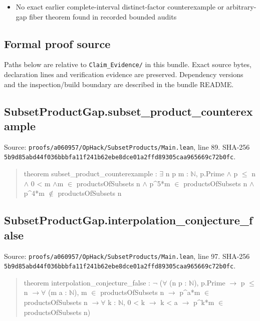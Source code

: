 \documentclass[11pt,a4paper]{article}
\begin{document}
\begin{itemize}
\item No exact earlier complete-interval distinct-factor counterexample or arbitrary-gap fiber theorem found in recorded bounded audits
\end{itemize}
\subsection{Formal proof source}
Paths below are relative to \texttt{Claim\_Evidence/} in this bundle. Exact source bytes, declaration lines and verification evidence are preserved. Dependency versions and the inspection/build boundary are described in the bundle README.

\subsection{SubsetProductGap.subset\_product\_counterexample}
Source: \texttt{proofs/a060957/OpHack/SubsetProducts/Main.lean}, line 89. SHA-256 \texttt{5b9d85abd44f036bbbfa11f241b62ebe8dce01a2ffd89305caa965669c72b0fc}.

\begin{quote}\small\ttfamily theorem subset\_product\_counterexample : \ensuremath{\exists} n p m : \ensuremath{\mathbb{N}}, p.Prime \ensuremath{\wedge} p \ensuremath{\leq} n \ensuremath{\wedge} 0 < m \ensuremath{\wedge}\newline m \ensuremath{\in} productsOfSubsets n \ensuremath{\wedge} p\textasciicircum{}5*m \ensuremath{\in} productsOfSubsets n \ensuremath{\wedge} p\textasciicircum{}4*m \ensuremath{\notin} productsOfSubsets n\end{quote}
\subsection{SubsetProductGap.interpolation\_conjecture\_false}
Source: \texttt{proofs/a060957/OpHack/SubsetProducts/Main.lean}, line 97. SHA-256 \texttt{5b9d85abd44f036bbbfa11f241b62ebe8dce01a2ffd89305caa965669c72b0fc}.

\begin{quote}\small\ttfamily theorem interpolation\_conjecture\_false : \ensuremath{\neg} (\ensuremath{\forall} (n p : \ensuremath{\mathbb{N}}), p.Prime \ensuremath{\to} p \ensuremath{\leq} n \ensuremath{\to}\newline \ensuremath{\forall} (m a : \ensuremath{\mathbb{N}}), m \ensuremath{\in} productsOfSubsets n \ensuremath{\to} p\textasciicircum{}a*m \ensuremath{\in} productsOfSubsets n \ensuremath{\to}\newline \ensuremath{\forall} k : \ensuremath{\mathbb{N}}, 0 < k \ensuremath{\to} k < a \ensuremath{\to} p\textasciicircum{}k*m \ensuremath{\in} productsOfSubsets n)\end{quote}
\end{document}
